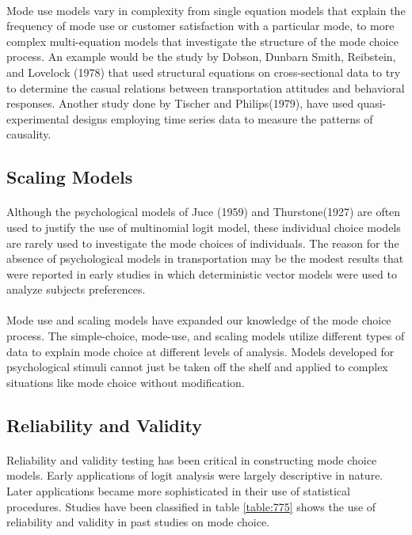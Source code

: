 \paragraph{}Mode use models vary in complexity from single equation models that explain the frequency of mode use or customer satisfaction with a particular mode, to more complex multi-equation models that investigate the structure of the mode choice process. An example would be the study by Dobson, Dunbarn Smith, Reibstein, and Lovelock (1978) that used structural equations on cross-sectional data to try to determine the casual relations between transportation attitudes and behavioral responses. Another study done by Tischer and Philips(1979), have used quasi-experimental designs employing time series data to measure the patterns of causality.

\subsection{Scaling Models}
\paragraph{}Although the psychological models of Juce (1959) and Thurstone(1927) are often used to justify the use of multinomial logit model, these individual choice models are rarely used to investigate the mode choices of individuals.  The reason for the absence of psychological models in transportation may be the modest results that were reported in early studies in which deterministic vector models were used to analyze subjects preferences.
\paragraph{}Mode use and scaling models have expanded our knowledge of the mode choice process. The simple-choice, mode-use, and scaling models utilize different types of data to explain mode choice at different levels of analysis. Models developed for psychological stimuli cannot just be taken off the shelf and applied to complex situations like mode choice without modification.

\subsection{Reliability and Validity}
\paragraph{}Reliability and validity testing has been critical in constructing mode choice models. Early applications of logit analysis were largely descriptive in nature. Later applications became more sophisticated in their use of statistical procedures. Studies have been classified in table \ref{table:775} shows the use of reliability and validity in past studies on mode choice.
 
